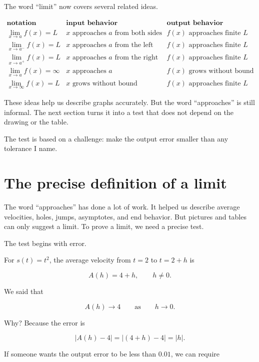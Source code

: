 The word ``limit'' now covers several related ideas.

\[
\begin{array}{c|c|c}
\textbf{notation} & \textbf{input behavior} & \textbf{output behavior} \\ \hline
\displaystyle \lim_{x\to a}f(x)=L
&
x\text{ approaches }a\text{ from both sides}
&
f(x)\text{ approaches finite }L \\[6pt]
\displaystyle \lim_{x\to a^-}f(x)=L
&
x\text{ approaches }a\text{ from the left}
&
f(x)\text{ approaches finite }L \\[6pt]
\displaystyle \lim_{x\to a^+}f(x)=L
&
x\text{ approaches }a\text{ from the right}
&
f(x)\text{ approaches finite }L \\[6pt]
\displaystyle \lim_{x\to a}f(x)=\infty
&
x\text{ approaches }a
&
f(x)\text{ grows without bound} \\[6pt]
\displaystyle \lim_{x\to\infty}f(x)=L
&
x\text{ grows without bound}
&
f(x)\text{ approaches finite }L
\end{array}
\]

These ideas help us describe graphs accurately.  But the word ``approaches'' is still informal.  The next section turns it into a test that does not depend on the drawing or the table.

The test is based on a challenge: make the output error smaller than any tolerance I name.

\section{The precise definition of a limit}
\label{sec:precise-limit-definition}

The word ``approaches'' has done a lot of work.  It helped us describe average velocities, holes, jumps, asymptotes, and end behavior.  But pictures and tables can only suggest a limit.  To prove a limit, we need a precise test.

The test begins with error.

For \(s(t)=t^2\), the average velocity from \(t=2\) to \(t=2+h\) is

\[
A(h)=4+h,
\qquad h\neq0.
\]

We said that

\[
A(h)\to4
\qquad\text{as}\qquad
h\to0.
\]

Why?  Because the error is

\[
|A(h)-4|
=
|(4+h)-4|
=
|h|.
\]

If someone wants the output error to be less than \(0.01\), we can require

